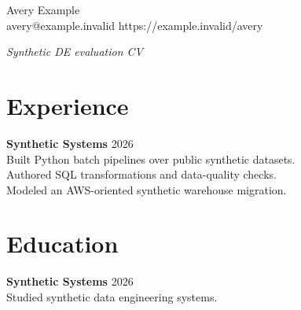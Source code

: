 \documentclass[10pt]{article}
\begin{document}
\begin{center}
{\Large Avery Example}\\
avery@example.invalid \quad https://example.invalid/avery
\end{center}
\textit{Synthetic DE evaluation CV}\\
\section*{Experience}
\textbf{Synthetic Systems} \hfill 2026\\
Built Python batch pipelines over public synthetic datasets.\\
Authored SQL transformations and data-quality checks.\\
Modeled an AWS-oriented synthetic warehouse migration.
\section*{Education}
\textbf{Synthetic Systems} \hfill 2026\\
Studied synthetic data engineering systems.
\end{document}

